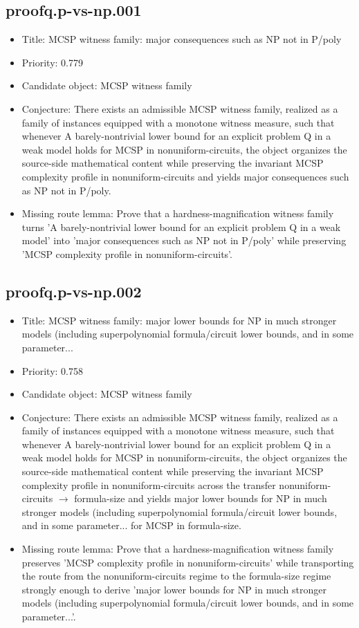 \documentclass[11pt]{article}
\begin{document}
\subsection*{proofq.p-vs-np.001}
\begin{itemize}[leftmargin=*,itemsep=0.2em]
\item Title: MCSP witness family: major consequences such as NP not in P/poly
\item Priority: 0.779
\item Candidate object: MCSP witness family
\item Conjecture: There exists an admissible MCSP witness family, realized as a family of instances equipped with a monotone witness measure, such that whenever A barely-nontrivial lower bound for an explicit problem Q in a weak model holds for MCSP in nonuniform-circuits, the object organizes the source-side mathematical content while preserving the invariant MCSP complexity profile in nonuniform-circuits and yields major consequences such as NP not in P/poly.
\item Missing route lemma: Prove that a hardness-magnification witness family turns 'A barely-nontrivial lower bound for an explicit problem Q in a weak model' into 'major consequences such as NP not in P/poly' while preserving 'MCSP complexity profile in nonuniform-circuits'.
\end{itemize}
\subsection*{proofq.p-vs-np.002}
\begin{itemize}[leftmargin=*,itemsep=0.2em]
\item Title: MCSP witness family: major lower bounds for NP in much stronger models (including superpolynomial formula/circuit lower bounds, and in some parameter...
\item Priority: 0.758
\item Candidate object: MCSP witness family
\item Conjecture: There exists an admissible MCSP witness family, realized as a family of instances equipped with a monotone witness measure, such that whenever A barely-nontrivial lower bound for an explicit problem Q in a weak model holds for MCSP in nonuniform-circuits, the object organizes the source-side mathematical content while preserving the invariant MCSP complexity profile in nonuniform-circuits across the transfer nonuniform-circuits $\rightarrow$  formula-size and yields major lower bounds for NP in much stronger models (including superpolynomial formula/circuit lower bounds, and in some parameter... for MCSP in formula-size.
\item Missing route lemma: Prove that a hardness-magnification witness family preserves 'MCSP complexity profile in nonuniform-circuits' while transporting the route from the nonuniform-circuits regime to the formula-size regime strongly enough to derive 'major lower bounds for NP in much stronger models (including superpolynomial formula/circuit lower bounds, and in some parameter...'.
\end{itemize}
\end{document}
